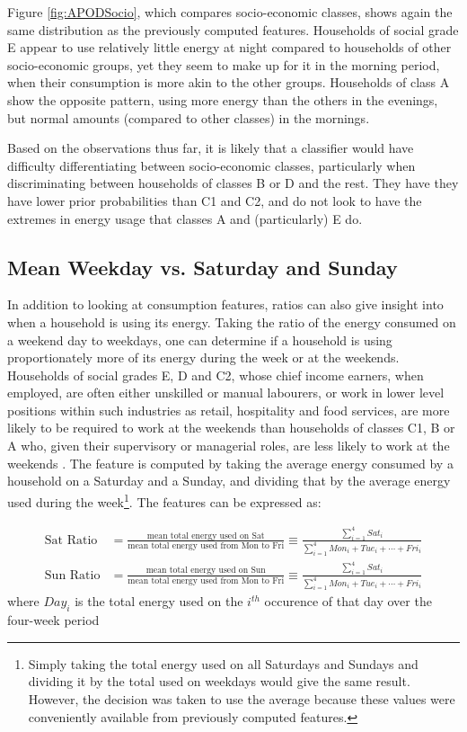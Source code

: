 \APODSocio %

Figure \ref{fig:APODSocio}, which compares socio-economic classes, shows again the same distribution as the previously computed features. Households of social grade E appear to use relatively little energy at night compared to households of other socio-economic groups, yet they seem to make up for it in the morning period, when their consumption is more akin to the other groups. Households of class A show the opposite pattern, using more energy than the others in the evenings, but normal amounts (compared to other classes) in the mornings.

Based on the observations thus far, it is likely that a classifier would have difficulty differentiating between socio-economic classes, particularly when discriminating between households of classes B or D and the rest. They have they have lower prior probabilities than C1 and C2, and do not look to have the extremes in energy usage that classes A and (particularly) E do. 


\subsection*{Mean Weekday vs. Saturday and Sunday}
In addition to looking at consumption features, ratios can also give insight into when a household is using its energy. Taking the ratio of the energy consumed on a weekend day to weekdays, one can determine if a household is using proportionately more of its energy during the week or at the weekends. Households of social grades E, D and C2, whose chief income earners, when employed, are often either unskilled or manual labourers, or work in lower level positions within such industries as retail, hospitality and food services, are more likely to be required to work at the weekends than households of classes C1, B or A who, given their supervisory or managerial roles, are less likely to work at the weekends \cite{careers}. The feature is computed by taking the average energy consumed by a household on a Saturday and a Sunday, and dividing that by the average energy used during the week\footnote{Simply taking the total energy used on all Saturdays and Sundays and dividing it by the total used on weekdays would give the same result. However, the decision was taken to use the average because these values were conveniently available from previously computed features.}. The features can be expressed as:

\begin{align*}
\text{Sat Ratio}&=\frac{\text{mean total energy used on Sat}}{\text{mean total energy used from Mon to Fri}}\equiv\frac{\sum_{i=1}^4Sat_i}{\sum_{i=1}^4{Mon_i + Tue_i+\cdots+ Fri_i}} \\
\text{Sun Ratio}&=\frac{\text{mean total energy used on Sun}}{\text{mean total energy used from Mon to Fri}}\equiv\frac{\sum_{i=1}^4Sat_i}{\sum_{i=1}^4{Mon_i + Tue_i+\cdots+ Fri_i}} 
\end{align*}
where $Day_i$ is the total energy used on the $i^{th}$ occurence of that day over the four-week period
\POWrat

